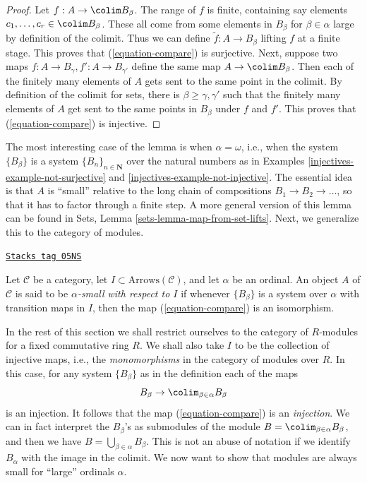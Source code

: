 \begin{proof}
Let $f : A \to \colim B_\beta$.
The range of $f$ is finite, containing say
elements $c_1, \ldots, c_r \in \colim B_\beta$.
These all come from some elements in $B_\beta$ for $\beta \in \alpha$
large by definition of the colimit. Thus we can define
$\widetilde{f} : A \to B_\beta$ lifting $f$ at a finite stage.
This proves that (\ref{equation-compare}) is surjective.
Next, suppose two maps $f : A \to B_\gamma, f' : A \to B_{\gamma'}$
define the same map $A \to \colim B_\beta$.
Then each of the finitely many elements of $A$ gets sent to the same point in
the colimit. By definition of the colimit for sets, there is
$\beta \geq \gamma, \gamma'$ such that the finitely many elements of
$A$ get sent to the same points in $B_\beta$ under $f$ and $f'$.
This proves that (\ref{equation-compare}) is injective.
\end{proof}

The most interesting case of the lemma is when $\alpha = \omega$, i.e.,
when the system $\{B_\beta\}$ is a system $\{B_n\}_{n \in \mathbf{N}}$
over the natural numbers as in
Examples \ref{injectives-example-not-surjective} and
\ref{injectives-example-not-injective}.
The essential idea is that $A$ is ``small'' relative to the long chain of
compositions $B_1 \to B_2 \to \ldots$, so that it has to factor through a
finite step. A more general version of this lemma can be found in
Sets, Lemma \ref{sets-lemma-map-from-set-lifts}.
Next, we generalize this to the category of modules.

\begin{definition}[Small]
\label{injectives-definition-small}
\href{https://stacks.math.columbia.edu/tag/05NS}{\texttt{Stacks tag 05NS}}

Let $\mathcal{C}$ be a category, let $I \subset \text{Arrows}(\mathcal{C})$,
and let $\alpha$ be an ordinal. An object $A$ of $\mathcal{C}$ is said to
be {\it $\alpha$-small with respect to $I$} if whenever $\{B_\beta\}$ is
a system over $\alpha$ with transition maps in $I$, then
the map (\ref{equation-compare}) is an isomorphism.
\end{definition}

In the rest of this section we shall restrict ourselves
to the category of $R$-modules for a fixed commutative ring $R$.
We shall also take $I$ to be the collection of injective maps, i.e., the
{\it monomorphisms} in the category of modules over $R$. In this case, for
any system $\{B_\beta\}$ as in the definition each of the maps
$$
B_\beta \to \colim_{\beta \in \alpha} B_\beta
$$
is an injection. It follows that the map (\ref{equation-compare}) is an
{\it injection}. We can in fact interpret the $B_\beta$'s as submodules
of the module $B = \colim_{\beta \in \alpha} B_\beta$, and then we
have $B = \bigcup_{\beta \in \alpha} B_\beta$. This is not an abuse of
notation if we identify $B_\alpha$ with the image in the colimit.
We now want to show that modules are always small for ``large'' ordinals
$\alpha$.

